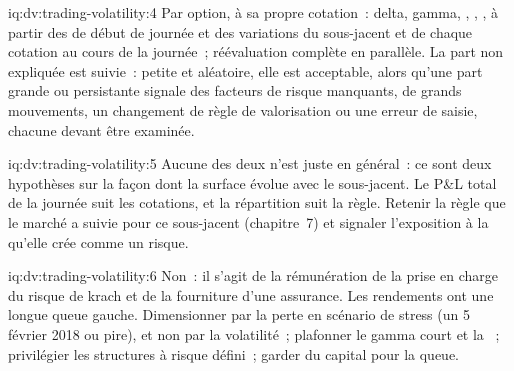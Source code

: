 \begin{solution}{iq:dv:trading-volatility:4}
Par option, à sa propre cotation~: delta, gamma, , , ,  à partir des  de début de journée et des variations du sous-jacent et de chaque cotation au cours de la journée~; réévaluation complète
en parallèle. La part non expliquée est suivie~: petite et aléatoire, elle est acceptable, alors qu'une part grande ou persistante signale des facteurs de risque manquants, de grands mouvements, un changement de règle de valorisation ou
une erreur de saisie, chacune devant être examinée.
\end{solution}

\begin{solution}{iq:dv:trading-volatility:5}
Aucune des deux n'est juste en général~: ce sont deux hypothèses sur la façon dont la surface évolue avec le sous-jacent. Le P\&L total de la journée suit les cotations, et la répartition
suit la règle. Retenir la règle que le marché a suivie pour ce sous-jacent (chapitre~7) et signaler l'exposition à la  qu'elle crée comme un risque.
\end{solution}

\begin{solution}{iq:dv:trading-volatility:6}
Non~: il s'agit de la rémunération de la prise en charge du risque de krach et de la fourniture d'une assurance. Les rendements ont une longue queue gauche. Dimensionner par la perte en scénario de stress (un 5 février 2018 ou pire), et non par
la volatilité~; plafonner le gamma court et la ~; privilégier les structures à risque défini~; garder du capital pour la queue.
\end{solution}
